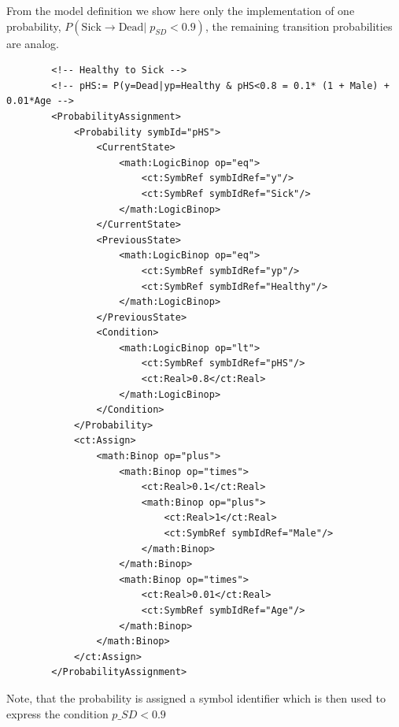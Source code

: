 From the model definition we show here only the implementation of one
probability, $P(\mbox{Sick} \rightarrow \mbox{Dead} | \; p_{SD} < 0.9)$, the remaining transition 
probabilities are analog.
\lstset{language=XML}
\begin{lstlisting}
        <!-- Healthy to Sick -->
        <!-- pHS:= P(y=Dead|yp=Healthy & pHS<0.8 = 0.1* (1 + Male) +  0.01*Age -->
        <ProbabilityAssignment>
            <Probability symbId="pHS">
                <CurrentState>
                    <math:LogicBinop op="eq">
                        <ct:SymbRef symbIdRef="y"/>
                        <ct:SymbRef symbIdRef="Sick"/>
                    </math:LogicBinop>
                </CurrentState>
                <PreviousState>
                    <math:LogicBinop op="eq">
                        <ct:SymbRef symbIdRef="yp"/>
                        <ct:SymbRef symbIdRef="Healthy"/>
                    </math:LogicBinop>
                </PreviousState>
                <Condition>
                    <math:LogicBinop op="lt">
                        <ct:SymbRef symbIdRef="pHS"/>
                        <ct:Real>0.8</ct:Real>
                    </math:LogicBinop>
                </Condition>
            </Probability>
            <ct:Assign>
                <math:Binop op="plus">
                    <math:Binop op="times">
                        <ct:Real>0.1</ct:Real>
                        <math:Binop op="plus">
                            <ct:Real>1</ct:Real>
                            <ct:SymbRef symbIdRef="Male"/>
                        </math:Binop>
                    </math:Binop>
                    <math:Binop op="times">
                        <ct:Real>0.01</ct:Real>
                        <ct:SymbRef symbIdRef="Age"/>
                    </math:Binop>
                </math:Binop>
            </ct:Assign>
        </ProbabilityAssignment>
\end{lstlisting}
Note, that the probability is assigned a symbol identifier 
which is then used to express the condition $p\_{SD}<0.9$

